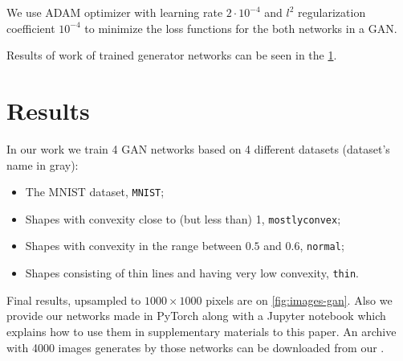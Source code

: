 \documentclass[reprint,amsmath,amssymb,aps,pre,showkeys,showpacs]{revtex4-1}
\newcommand{\code}[1]{\colorbox{light-gray}{\texttt{#1}}}
\newcommand{\highlight}[1]{{\color{red}{#1}}} %
\begin{document}
We use ADAM optimizer\cite{kingma2014adam} with learning rate $2 \cdot 10^{-4}$
and $l^2$ regularization coefficient $10^{-4}$ to minimize the loss functions
for the both networks in a GAN.

Results of work of trained generator networks can be seen in the
\cref{sec:results}.

\section{Results}
\label{sec:results}
In our work we train 4 GAN networks based on 4 different datasets (dataset's
name in gray):
\begin{itemize}
\item The MNIST dataset, \code{MNIST};
\item Shapes with convexity close to (but less than) 1, \code{mostlyconvex};
\item Shapes with convexity in the range between $0.5$ and $0.6$, \code{normal};
\item Shapes consisting of thin lines and having very low convexity, \code{thin}.
\end{itemize}

Final results, upsampled \highlight{how} to $1000 \times 1000$ pixels are on
\cref{fig:images-gan}. Also we provide our networks made in PyTorch along with a
Jupyter notebook which explains how to use them in supplementary materials to
this paper. An archive with 4000 images generates by those networks can be
downloaded from our \highlight{repository}.
\end{document}
